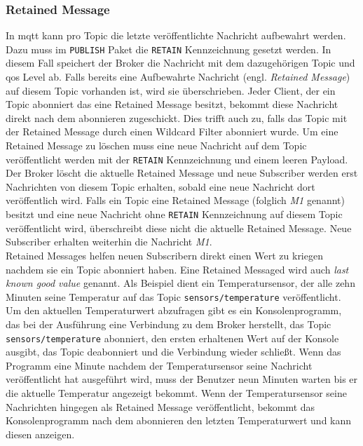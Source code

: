 \subsubsection{Retained Message} \label{s:retained-messages}
In \ac{mqtt} kann pro Topic die letzte veröffentlichte Nachricht aufbewahrt werden.
Dazu muss im \verb|PUBLISH| Paket die \verb|RETAIN| Kennzeichnung gesetzt werden.
In diesem Fall speichert der Broker die Nachricht mit dem dazugehörigen Topic und \ac{qos} Level ab.
Falls bereits eine Aufbewahrte Nachricht (engl. \textit{Retained Message}) auf diesem Topic vorhanden ist, wird sie überschrieben.
Jeder Client, der ein Topic abonniert das eine Retained Message besitzt, bekommt diese Nachricht direkt nach dem abonnieren zugeschickt.
Dies trifft auch zu, falls das Topic mit der Retained Message durch einen Wildcard Filter abonniert wurde.
\cite{teamRetainedMessagesMQTT}
Um eine Retained Message zu löschen muss eine neue Nachricht auf dem Topic veröffentlicht werden mit der \verb|RETAIN| Kennzeichnung und einem leeren Payload. Der Broker löscht die aktuelle Retained Message und neue Subscriber werden erst Nachrichten von diesem Topic erhalten, sobald eine neue Nachricht dort veröffentlich wird.
Falls ein Topic eine Retained Message (folglich \textit{M1} genannt) besitzt und eine neue Nachricht ohne \verb|RETAIN| Kennzeichnung auf diesem Topic veröffentlicht wird, überschreibt diese nicht die aktuelle Retained Message. Neue Subscriber erhalten weiterhin die Nachricht \textit{M1}.
\cite{mqtt5Specification}
\\
Retained Messages helfen neuen Subscribern direkt einen Wert zu kriegen nachdem sie ein Topic abonniert haben. Eine Retained Messaged wird auch \textit{last known good value} genannt.
\cite{teamRetainedMessagesMQTT}
Als Beispiel dient ein Temperatursensor, der alle zehn Minuten seine Temperatur auf das Topic \verb|sensors/temperature| veröffentlicht. Um den aktuellen Temperaturwert abzufragen gibt es ein Konsolenprogramm, das bei der Ausführung eine Verbindung zu dem Broker herstellt, das Topic \verb|sensors/temperature| abonniert, den ersten erhaltenen Wert auf der Konsole ausgibt, das Topic deabonniert und die Verbindung wieder schlie{\ss}t. Wenn das Programm eine Minute nachdem der Temperatursensor seine Nachricht veröffentlicht hat ausgeführt wird, muss der Benutzer neun Minuten warten bis er die aktuelle Temperatur angezeigt bekommt. Wenn der Temperatursensor seine Nachrichten hingegen als Retained Message veröffentlicht, bekommt das Konsolenprogramm nach dem abonnieren den letzten Temperaturwert und kann diesen anzeigen.


